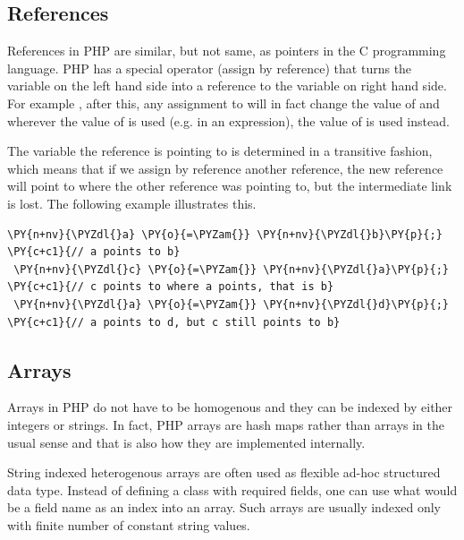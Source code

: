     \subsection{References}
    References in PHP are similar, but not same, as pointers 
    in the C programming language. PHP has a special 
    operator \code{=\&} (assign by reference) that turns 
    the variable on the 
    left hand side into a reference to the 
    variable on right hand side. For example , 
    after this, any assignment 
    to  will in fact change the 
    value of  and wherever 
    the value of  is used (e.g. in an expression), 
    the value of  is used instead.
    
    The variable the reference is pointing to is determined 
    in a transitive fashion, which means that if we assign 
    by reference another reference, the new reference will 
    point to where the other reference was pointing to, 
    but the intermediate link is lost. The following example 
    illustrates this.
    
\begin{Verbatim}[commandchars=\\\{\}]
 \PY{n+nv}{\PYZdl{}a} \PY{o}{=\PYZam{}} \PY{n+nv}{\PYZdl{}b}\PY{p}{;}       \PY{c+c1}{// a points to b}
 \PY{n+nv}{\PYZdl{}c} \PY{o}{=\PYZam{}} \PY{n+nv}{\PYZdl{}a}\PY{p}{;}       \PY{c+c1}{// c points to where a points, that is b}
 \PY{n+nv}{\PYZdl{}a} \PY{o}{=\PYZam{}} \PY{n+nv}{\PYZdl{}d}\PY{p}{;}       \PY{c+c1}{// a points to d, but c still points to b}
\end{Verbatim}

    \subsection{Arrays}
    Arrays in PHP do not have to be homogenous and 
    they can be indexed by either integers or strings.
    In fact, PHP arrays are hash maps rather than arrays 
    in the usual sense and that is also how they are 
    implemented internally. 
    
    String indexed heterogenous arrays are often used 
    as flexible ad-hoc structured data type. 
    Instead of defining a class 
    with required fields, one can use what would be a 
    field name as an index into an array. Such arrays 
    are usually indexed only with finite number of 
    constant string values. 
    
